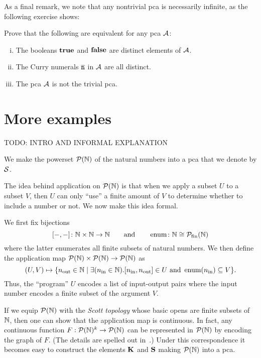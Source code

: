As a final remark, we note that any nontrivial pca is necessarily infinite, as
the following exercise shows:
\begin{exercise}
  Prove that the following are equivalent for any pca \(\AA\):
  \begin{enumerate}[(i)]
  \item The booleans \(\pcatrue\) and \(\pcafalse\) are distinct elements of
    \(\AA\).
  \item The Curry numerals \(\numeral{n}\) in \(\AA\) are all distinct.
  \item The pca \(\AA\) is not the trivial pca.
  \end{enumerate}
\end{exercise}

\section{More examples}

\textcolor{Mulberry}{TODO: INTRO AND INFORMAL EXPLANATION}

\cite{Bauer2006}
\cite{Bauer2000}
\cite{Weihrauch2000}
\cite{Lietz2004}

\cite{Scott1976}
\begin{example}
  We make the powerset \(\PN\) of the natural numbers into a pca that we denote
  by \(\Scott\).

  The idea behind application on \(\PN\) is that when we apply a subset \(U\) to
  a subset \(V\), then \(U\) can only ``use'' a finite amount of \(V\) to
  determine whether to include a number or not. We now make this idea formal.

  We first fix bijections
  \[
    \pairing{{-},{-}} \colon \Nat \times \Nat \to \Nat
    \quad\quad\text{and}\quad\quad
    \enum \colon \Nat \cong \powerset_{\operatorname{fin}}(\Nat)
  \]
  where the latter enumerates all finite subsets of natural numbers.
  We then define the application map \(\PN \times \PN \to \PN\) as
  \[
    (U,V) \mapsto \set{\outputnum \in \Nat \mid
            \exists(\inputnum \in \Nat) .
            \pairing{\inputnum,\outputnum} \in U \text{ and } \enum(\inputnum) \subseteq V}.
  \]
  Thus, the ``program'' \(U\) encodes a list of input-output pairs where the
  input number encodes a finite subset of the argument \(V\).

  If we equip \(\PN\) with the \emph{Scott topology} whose basic opens are
  finite subsets of \(\Nat\), then one can show that the application map is
  continuous.
  In fact, any continuous function \(F : \PN^k \to \PN\) can be represented in
  \(\PN\) by encoding the graph of \(F\).
  (The details are spelled out in~\cite[Example~2.3.4]{deJong2018}.)
  Under this correspondence it becomes easy to construct the elements \(\kcomb\)
  and \(\scomb\) making \(\PN\) into a pca.
\end{example}


